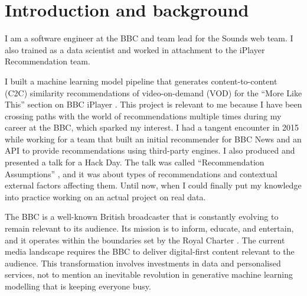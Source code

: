 
\section{Introduction and background}

I am a software engineer at the BBC and team lead for the Sounds web team.
I also trained as a data scientist and worked in attachment to the iPlayer Recommendation team.

I built a machine learning model pipeline that generates content-to-content (C2C) similarity recommendations
of video-on-demand (VOD) for the ``More Like This'' section on BBC iPlayer \cite{BBC:MoreLikeBluey}.
This project is relevant to me because I have been crossing paths with the world of recommendations multiple times
during my career at the BBC, which sparked my interest.
I had a tangent encounter in 2015 while working for a team that built
an initial recommender for BBC News and an API to provide recommendations using third-party engines.
I also produced and presented a talk for a Hack Day.
The talk was called ``Recommendation Assumptions'' \cite{RecsAssumptions},
and it was about types of recommendations and contextual external factors affecting them.
Until now, when I could finally put my knowledge into practice working on an actual project on real data.

The BBC is a well-known British broadcaster that is constantly evolving to remain relevant to its audience.
Its mission is to inform, educate, and entertain, and it operates within the boundaries set by the Royal Charter \cite{BBC:RoyalCharter}.
The current media landscape requires the BBC to deliver digital-first content relevant to the audience.
This transformation involves investments in data and personalised services,
not to mention an inevitable revolution in generative machine learning modelling that is keeping everyone busy.

